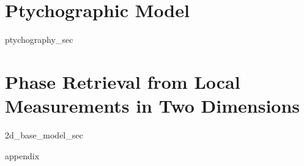 \documentclass[12pt]{ucsd-thesis}
\begin{document}
\chapter{Ptychographic Model}
{ptychography_sec}

\chapter{Phase Retrieval from Local Measurements in Two Dimensions}
{2d_base_model_sec}



\appendix
{appendix}


\end{document}
